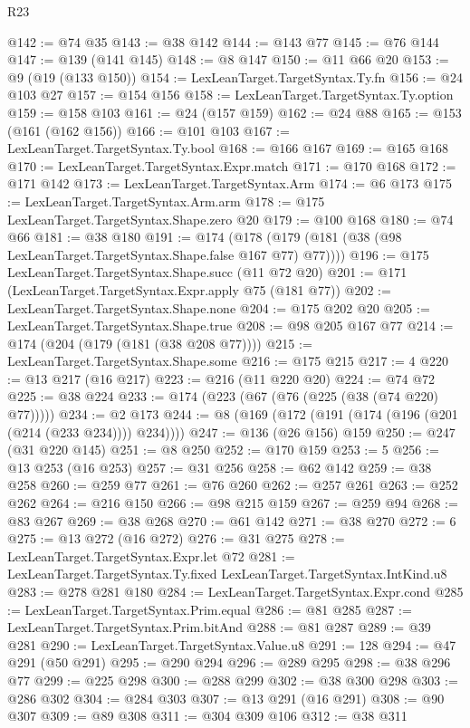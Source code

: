 \begin{lexlean}{R23}
\begin{coremodule}
{{{{{{{{{{{{{{{{{{{{{@142 := @74 @35
@143 := @38 @142
@144 := @143 @77
@145 := @76 @144
@147 := @139 (@141 @145)
@148 := @8 @147
@150 := @11 @66 @20
@153 := @9 (@19 (@133 @150))
@154 := LexLeanTarget.TargetSyntax.Ty.fn
@156 := @24 @103 @27
@157 := @154 @156
@158 := LexLeanTarget.TargetSyntax.Ty.option
@159 := @158 @103
@161 := @24 (@157 @159)
@162 := @24 @88
@165 := @153 (@161 (@162 @156))
@166 := @101 @103
@167 := LexLeanTarget.TargetSyntax.Ty.bool
@168 := @166 @167
@169 := @165 @168
@170 := LexLeanTarget.TargetSyntax.Expr.match
@171 := @170 @168
@172 := @171 @142
@173 := LexLeanTarget.TargetSyntax.Arm
@174 := @6 @173
@175 := LexLeanTarget.TargetSyntax.Arm.arm
@178 := @175 LexLeanTarget.TargetSyntax.Shape.zero @20
@179 := @100 @168
@180 := @74 @66
@181 := @38 @180
@191 := @174 (@178 (@179 (@181 (@38 (@98 LexLeanTarget.TargetSyntax.Shape.false @167 @77) @77))))
@196 := @175 LexLeanTarget.TargetSyntax.Shape.succ (@11 @72 @20)
@201 := @171 (LexLeanTarget.TargetSyntax.Expr.apply @75 (@181 @77))
@202 := LexLeanTarget.TargetSyntax.Shape.none
@204 := @175 @202 @20
@205 := LexLeanTarget.TargetSyntax.Shape.true
@208 := @98 @205 @167 @77
@214 := @174 (@204 (@179 (@181 (@38 @208 @77))))
@215 := LexLeanTarget.TargetSyntax.Shape.some
@216 := @175 @215
@217 := 4
@220 := @13 @217 (@16 @217)
@223 := @216 (@11 @220 @20)
@224 := @74 @72
@225 := @38 @224
@233 := @174 (@223 (@67 (@76 (@225 (@38 (@74 @220) @77)))))
@234 := @2 @173
@244 := @8 (@169 (@172 (@191 (@174 (@196 (@201 (@214 (@233 @234)))) @234))))
@247 := @136 (@26 @156) @159
@250 := @247 (@31 @220 @145)
@251 := @8 @250
@252 := @170 @159
@253 := 5
@256 := @13 @253 (@16 @253)
@257 := @31 @256
@258 := @62 @142
@259 := @38 @258
@260 := @259 @77
@261 := @76 @260
@262 := @257 @261
@263 := @252 @262
@264 := @216 @150
@266 := @98 @215 @159
@267 := @259 @94
@268 := @83 @267
@269 := @38 @268
@270 := @61 @142
@271 := @38 @270
@272 := 6
@275 := @13 @272 (@16 @272)
@276 := @31 @275
@278 := LexLeanTarget.TargetSyntax.Expr.let @72
@281 := LexLeanTarget.TargetSyntax.Ty.fixed LexLeanTarget.TargetSyntax.IntKind.u8
@283 := @278 @281 @180
@284 := LexLeanTarget.TargetSyntax.Expr.cond
@285 := LexLeanTarget.TargetSyntax.Prim.equal
@286 := @81 @285
@287 := LexLeanTarget.TargetSyntax.Prim.bitAnd
@288 := @81 @287
@289 := @39 @281
@290 := LexLeanTarget.TargetSyntax.Value.u8
@291 := 128
@294 := @47 @291 (@50 @291)
@295 := @290 @294
@296 := @289 @295
@298 := @38 @296 @77
@299 := @225 @298
@300 := @288 @299
@302 := @38 @300 @298
@303 := @286 @302
@304 := @284 @303
@307 := @13 @291 (@16 @291)
@308 := @90 @307
@309 := @89 @308
@311 := @304 @309 @106
@312 := @38 @311
}}}}}}}}}}}}}}}}}}}}}
\end{coremodule}
\end{lexlean}

